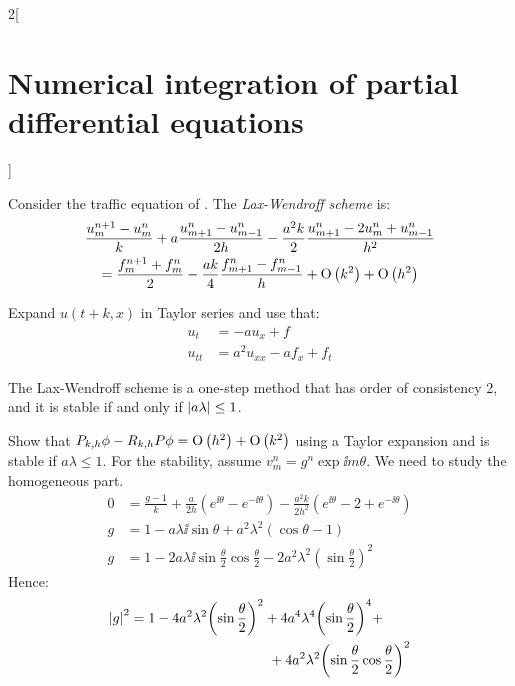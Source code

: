 \documentclass[../../../main_math.tex]{subfiles}
\begin{document}
\begin{multicols}{2}[\section{Numerical integration of partial differential equations}]
  \begin{proposition}
    Consider the traffic equation of .
    The \emph{Lax-Wendroff scheme} is:
    \begin{multline*}
      \frac{u_m^{n+1}-u_{m}^n}{k}+a\frac{u_{m+1}^{n}-u_{m-1}^n}{2h}-\frac{a^2k}{2}\frac{u_{m+1}^n-2u_m^n+u_{m-1}^n}{h^2} \\ =\frac{f_m^{n+1}+f_m^n}{2}-\frac{ak}{4}\frac{f_{m+1}^n-f_{m-1}^n}{h}+\mathrm{O}\left(k^2\right)+\mathrm{O}\left(h^2\right)
    \end{multline*}
  \end{proposition}
  \begin{sproof}
    Expand $u(t+k,x)$ in Taylor series and use that:
    \begin{align*}
      u_t    & =-au_x+f            \\
      u_{tt} & =a^2u_{xx}-af_x+f_t
    \end{align*}
  \end{sproof}
  \begin{proposition}
    The Lax-Wendroff scheme is a one-step method that has order of consistency 2, and it is stable if and only if $\abs{a\lambda} \leq 1$.
  \end{proposition}
  \begin{sproof}
    Show that $P_{k,h}\phi-R_{k,h}P\phi=\mathrm{O}\left(h^2\right)+\mathrm{O}\left(k^2\right)$ using a Taylor expansion and is stable if $a\lambda\leq 1$. For the stability, assume $v_m^n=g^n\exp{\ii m\theta}$. We need to study the homogeneous part.
    \begin{align*}
      0 & =\frac{g-1}{k}+\frac{a}{2h}\left(e^{\ii\theta}-e^{-\ii\theta}\right)-\frac{a^2k}{2h^2}\left(e^{\ii\theta}-2+e^{-\ii\theta}\right) \\
      g & = 1-a\lambda\ii\sin\theta+a^2\lambda^2(\cos\theta-1)                                                                              \\
      g & = 1-2a\lambda\ii\sin\frac{\theta}{2}\cos\frac{\theta}{2} -2a^2\lambda^2{\left(\sin\frac{\theta}{2}\right)}^2
    \end{align*}
    Hence:
    \begin{align*}
      \begin{split}
        \abs{g}^2&=1-4a^2\lambda^2 {\left(\sin\frac{\theta}{2} \right)}^2+4a^4\lambda^4{\left(\sin\frac{\theta}{2}\right)}^4+\\
        &\hspace{3.5cm}+4a^2\lambda^2{\left(\sin\frac{\theta}{2}\cos\frac{\theta}{2}\right)}^2
      \end{split} \\

\end{align*}
\end{sproof}
\end{multicols}
\end{document}
